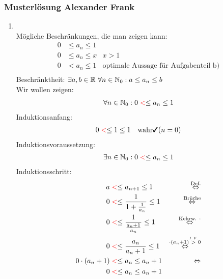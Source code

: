 \subsubsection{Musterlösung Alexander Frank}
\begin{enumerate}[label=\alph*)]
    \item \textbf{}\\
    Mögliche Beschränkungen, die man zeigen kann:
    \begin{align*}
        0 &\leq a_n \leq 1\\
        0 &\leq a_n \leq x & x > 1\\
        0 &< a_n \leq 1 & \text{optimale Aussage für Aufgabenteil b)}\\
    \end{align*}
    Beschränktheit: $\exists a, b \in \mathbb R \ \forall n \in \mathbb N_0: a \leq a_n \leq b$\\
    Wir wollen zeigen:
    \begin{align*}
        \forall n \in \mathbb N_0: 0 \color{red}<\color{black}\leq a_n \leq 1
    \end{align*}
    Induktionsanfang:
    \begin{align*}
        0 &\redkleiner\leq 1 \leq 1 & \text{wahr} \cmark (n = 0)
    \end{align*}
    Induktionsvoraussetzung:
    \begin{align*}
        \exists n \in \mathbb N_0: 0 \color{red}<\color{black}\leq a_n \leq 1
    \end{align*}
    Induktionsschritt:
    \begin{align*}
        a &\color{red}<\color{black}\leq a_{n+1} \leq 1 & \overset{\text{Def.}}{\Leftrightarrow}\\
        0 &\color{red}<\color{black}\leq \frac{1}{1 + \frac{1}{a_n}} \leq 1 & \overset{\text{Brüche}}{\Leftrightarrow}\\
        0 &\color{red}<\color{black}\leq \frac{1}{\frac{a_n + 1}{a_n}} \leq 1 & \overset{\text{Kehrw. }\cdot}{\Leftrightarrow}\\
        0 &\color{red}<\color{black}\leq \frac{a_n}{a_n +1} \leq 1 & \overset{\cdot (a_n + 1) \overset{I.V.}{>} 0}{\Leftrightarrow}\\
        0 \cdot (a_n +1) &\color{red}<\color{black}\leq a_n \leq a_n +1 & \Leftrightarrow\\
        0 &\color{red}<\color{black}\leq a_n \leq a_n +1
    \end{align*}
    

\end{enumerate}
